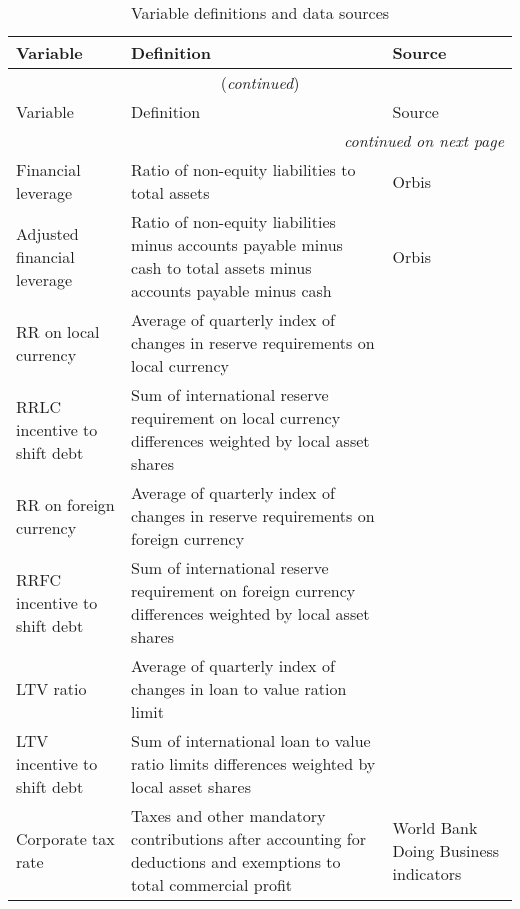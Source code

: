 	\centering
		\begin{longtable}{p{1.7in}p{2.6in}p{1.7in}}
			\caption{Variable definitions and data sources}
			\label{tab:3}\\
			\hline 
			Variable      & Definition & Source \\
			\hline \endfirsthead
			
			\multicolumn{3}{c}{{ \tablename \thetable{} (\textit{continued})}}\\
			\hline	
			Variable      & Definition & Source \\
			\hline  \endhead
			
			\hline
			\multicolumn{3}{r}{{\textit{continued on next page}}}\\ 
			\endfoot
			\hline
			\endlastfoot
			Financial leverage      & Ratio of non-equity liabilities to total assets & Orbis \\
			Adjusted financial leverage      & Ratio of non-equity liabilities minus accounts payable minus cash to total assets minus accounts payable minus cash & Orbis\\
			RR on local currency & Average of quarterly index of changes in reserve requirements on local currency & \cite{cerutti2017changes}\\
			RRLC incentive to shift debt & Sum of international reserve requirement on local currency differences weighted by local asset shares& \cite{cerutti2017changes}\\
			RR on foreign currency & Average of quarterly index of changes in reserve requirements on foreign currency & \cite{cerutti2017changes}\\
			RRFC incentive to shift debt & Sum of international reserve requirement on foreign currency differences weighted by local asset shares& \cite{cerutti2017changes}\\
			LTV ratio & Average of quarterly index of changes in loan to value ration limit & \cite{cerutti2017changes}\\
			LTV incentive to shift debt & Sum of international loan to value ratio limits differences weighted by local asset shares& \cite{cerutti2017changes}\\
			Corporate tax rate & Taxes and other mandatory contributions after accounting  for deductions and exemptions to total commercial profit & World Bank Doing Business indicators\\

\end{longtable}
